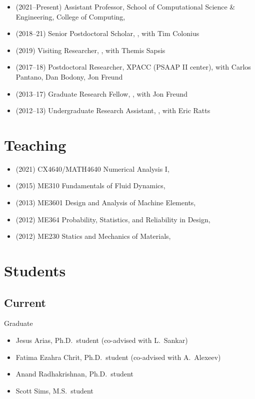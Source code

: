 \begin{itemize}
    \item (2021--Present) Assistant Professor, School of Computational Science \& Engineering, College of Computing, \GIT
    \item (2018--21) Senior Postdoctoral Scholar, \CIT, with Tim Colonius
    \item (2019) Visiting Researcher, \MIT, with Themis Sapsis
    \item (2017--18) Postdoctoral Researcher, XPACC (PSAAP II center), with Carlos Pantano, Dan Bodony, Jon Freund
    \item (2013--17) Graduate Research Fellow, \UIUC, with Jon Freund
    \item (2012--13) Undergraduate Research Assistant, \UMD, with Eric Ratts
\end{itemize}

\section{Teaching}

\begin{itemize}
    \item (2021) CX4640/MATH4640 Numerical Analysis I, \GIT
    \item (2015) ME310 Fundamentals of Fluid Dynamics, \UIUC
    \item (2013) ME3601 Design and Analysis of Machine Elements, \UMD
    \item (2012) ME364 Probability, Statistics, and Reliability in Design, \UMD
    \item (2012) ME230 Statics and Mechanics of Materials, \UMD
\end{itemize}


\section{Students}

\subsection{Current}

Graduate
\begin{itemize}
    \item Jesus Arias, Ph.D.\ student (co-advised with L.\ Sankar)
    \item Fatima Ezahra Chrit, Ph.D.\ student (co-advised with A.\ Alexeev)
    \item Anand Radhakrishnan, Ph.D.\ student
    \item Scott Sims, M.S.\ student
\end{itemize}


